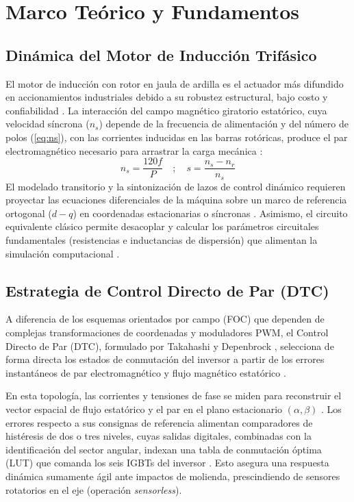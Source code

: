 \documentclass[conference]{IEEEtran}
\begin{document}
\section{Marco Teórico y Fundamentos}

\subsection{Dinámica del Motor de Inducción Trifásico}
El motor de inducción con rotor en jaula de ardilla es el actuador más difundido en accionamientos industriales debido a su robustez estructural, bajo costo y confiabilidad \cite{chapman2012}. La interacción del campo magnético giratorio estatórico, cuya velocidad síncrona ($n_s$) depende de la frecuencia de alimentación y del número de polos (\autoref{eq:ns}), con las corrientes inducidas en las barras rotóricas, produce el par electromagnético necesario para arrastrar la carga mecánica \cite{fitzgerald2003, krishnan2001}:
\begin{equation}
    n_s = \frac{120 f}{P} \quad ; \quad s = \frac{n_s - n_r}{n_s}
    \label{eq:ns}
\end{equation}
El modelado transitorio y la sintonización de lazos de control dinámico requieren proyectar las ecuaciones diferenciales de la máquina sobre un marco de referencia ortogonal ($d-q$) en coordenadas estacionarias o síncronas \cite{leonhard2001}. Asimismo, el circuito equivalente clásico permite desacoplar y calcular los parámetros circuitales fundamentales (resistencias e inductancias de dispersión) que alimentan la simulación computacional \cite{ieee112}.

\subsection{Estrategia de Control Directo de Par (DTC)}
A diferencia de los esquemas orientados por campo (FOC) que dependen de complejas transformaciones de coordenadas y moduladores PWM, el Control Directo de Par (DTC), formulado por Takahashi y Depenbrock \cite{takahashi1986, depenbrock1988}, selecciona de forma directa los estados de conmutación del inversor a partir de los errores instantáneos de par electromagnético y flujo magnético estatórico \cite{vas1998}.

En esta topología, las corrientes y tensiones de fase se miden para reconstruir el vector espacial de flujo estatórico y el par en el plano estacionario $(\alpha, \beta)$ \cite{kazmierkowski2002}. Los errores respecto a sus consignas de referencia alimentan comparadores de histéresis de dos o tres niveles, cuyas salidas digitales, combinadas con la identificación del sector angular, indexan una tabla de conmutación óptima (LUT) que comanda los seis IGBTs del inversor \cite{bose2001}. Esto asegura una respuesta dinámica sumamente ágil ante impactos de molienda, prescindiendo de sensores rotatorios en el eje (operación \textit{sensorless}).
\end{document}
